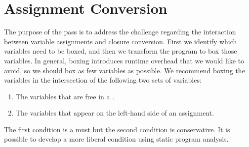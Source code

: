 \documentclass[7x10]{TimesAPriori_MIT}%
\numberwithin{theorem}{chapter}
\numberwithin{definition}{chapter}
\numberwithin{equation}{chapter}
\begin{document}
\section{Assignment Conversion}
\label{sec:convert-assignments}

The purpose of the  pass is to address the
challenge regarding the interaction between variable assignments and
closure conversion.  First we identify which variables need to be
boxed, and then we transform the program to box those variables. In
general, boxing introduces runtime overhead that we would like to
avoid, so we should box as few variables as possible. We recommend
boxing the variables in the intersection of the following two sets of
variables:
\begin{enumerate}
\item The variables that are free in a .
\item The variables that appear on the left-hand side of an
  assignment.
\end{enumerate}
The first condition is a must but the second condition is
conservative. It is possible to develop a more liberal condition using
static program analysis.
\end{document}
